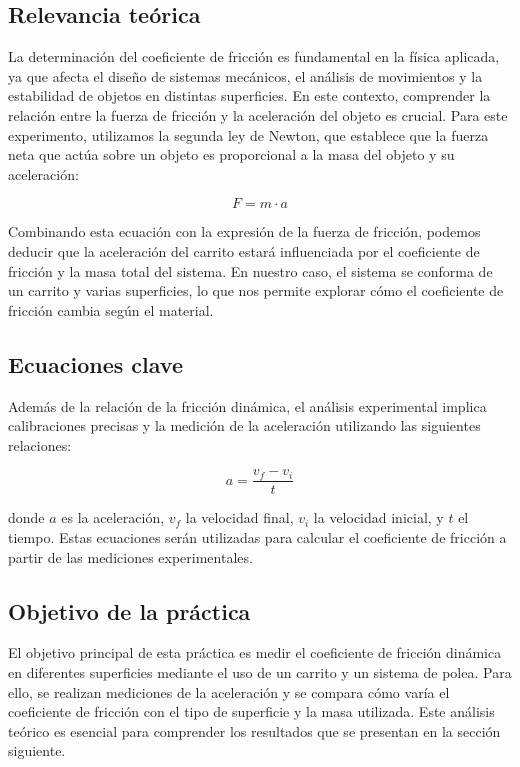 \documentclass[12pt,a4]{article}
\begin{document}
\subsection{Relevancia teórica}

La determinación del coeficiente de fricción es fundamental en la física aplicada, ya que afecta el diseño de sistemas mecánicos, el análisis de movimientos y la estabilidad de objetos en distintas superficies. En este contexto, comprender la relación entre la fuerza de fricción y la aceleración del objeto es crucial. Para este experimento, utilizamos la segunda ley de Newton, que establece que la fuerza neta que actúa sobre un objeto es proporcional a la masa del objeto y su aceleración:

\[
F = m \cdot a
\]

Combinando esta ecuación con la expresión de la fuerza de fricción, podemos deducir que la aceleración del carrito estará influenciada por el coeficiente de fricción y la masa total del sistema. En nuestro caso, el sistema se conforma de un carrito y varias superficies, lo que nos permite explorar cómo el coeficiente de fricción cambia según el material.

\subsection{Ecuaciones clave}

Además de la relación de la fricción dinámica, el análisis experimental implica calibraciones precisas y la medición de la aceleración utilizando las siguientes relaciones:

\[
a = \frac{v_f - v_i}{t}
\]

donde \(a\) es la aceleración, \(v_f\) la velocidad final, \(v_i\) la velocidad inicial, y \(t\) el tiempo. Estas ecuaciones serán utilizadas para calcular el coeficiente de fricción a partir de las mediciones experimentales.

\subsection{Objetivo de la práctica}

El objetivo principal de esta práctica es medir el coeficiente de fricción dinámica en diferentes superficies mediante el uso de un carrito y un sistema de polea. Para ello, se realizan mediciones de la aceleración y se compara cómo varía el coeficiente de fricción con el tipo de superficie y la masa utilizada. Este análisis teórico es esencial para comprender los resultados que se presentan en la sección siguiente.
\end{document}
